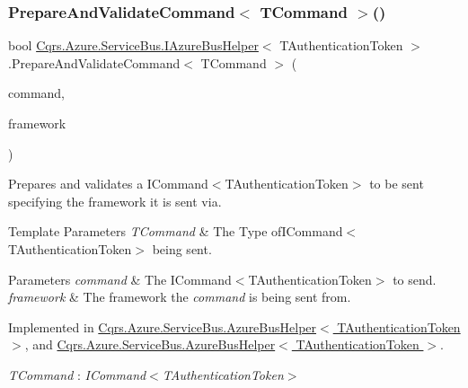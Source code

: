 \subsubsection{\texorpdfstring{Prepare\+And\+Validate\+Command$<$ T\+Command $>$()}{PrepareAndValidateCommand< TCommand >()}}
{\footnotesize\ttfamily bool \hyperlink{interfaceCqrs_1_1Azure_1_1ServiceBus_1_1IAzureBusHelper}{Cqrs.\+Azure.\+Service\+Bus.\+I\+Azure\+Bus\+Helper}$<$ T\+Authentication\+Token $>$.Prepare\+And\+Validate\+Command$<$ T\+Command $>$ (\begin{DoxyParamCaption}\item[{T\+Command}]{command,  }\item[{string}]{framework }\end{DoxyParamCaption})}



Prepares and validates a I\+Command$<$\+T\+Authentication\+Token$>$ to be sent specifying the framework it is sent via. 


\begin{DoxyTemplParams}{Template Parameters}
{\em T\+Command} & The Type ofI\+Command$<$\+T\+Authentication\+Token$>$ being sent.\\
\hline
\end{DoxyTemplParams}

\begin{DoxyParams}{Parameters}
{\em command} & The I\+Command$<$\+T\+Authentication\+Token$>$ to send.\\
\hline
{\em framework} & The framework the {\itshape command}  is being sent from.\\
\hline
\end{DoxyParams}


Implemented in \hyperlink{classCqrs_1_1Azure_1_1ServiceBus_1_1AzureBusHelper_a4d03f55a58a018fbbf6fd518ad9b24f8_a4d03f55a58a018fbbf6fd518ad9b24f8}{Cqrs.\+Azure.\+Service\+Bus.\+Azure\+Bus\+Helper$<$ T\+Authentication\+Token $>$}, and \hyperlink{classCqrs_1_1Azure_1_1ServiceBus_1_1AzureBusHelper_a4d03f55a58a018fbbf6fd518ad9b24f8_a4d03f55a58a018fbbf6fd518ad9b24f8}{Cqrs.\+Azure.\+Service\+Bus.\+Azure\+Bus\+Helper$<$ T\+Authentication\+Token $>$}.

\begin{Desc}
\item[Type Constraints]\begin{description}
\item[{\em T\+Command} : {\em I\+Command$<$T\+Authentication\+Token$>$}]\end{description}
\end{Desc}
\mbox{\label{interfaceCqrs_1_1Azure_1_1ServiceBus_1_1IAzureBusHelper_ac5cbeb6e8bbdb1a98501f0b746c12abd_ac5cbeb6e8bbdb1a98501f0b746c12abd}} 
